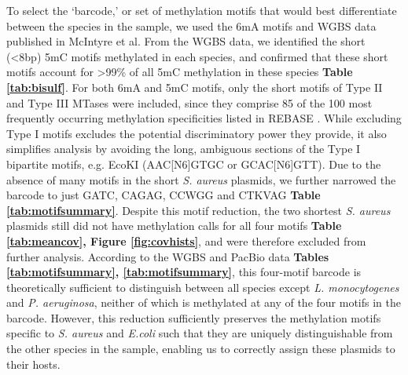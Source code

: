 To select the ‘barcode,’ or set of methylation motifs that would best differentiate between the species in the sample, we used the 6mA motifs and WGBS data published in McIntyre \citep{McIntyre2017-ed} et al. From the WGBS data, we identified the short (<8bp) 5mC motifs methylated in each species, and confirmed that these short motifs account for >99\% of all 5mC methylation in these species {\bf Table \ref{tab:bisulf}}. For both 6mA and 5mC motifs, only the short motifs of Type II and Type III MTases were included, since they comprise 85 of the 100 most frequently occurring methylation specificities listed in REBASE \citep{Roberts2003-ss}. While excluding Type I motifs excludes the potential discriminatory power they provide, it also simplifies analysis by avoiding the long, ambiguous sections of the Type I bipartite motifs, e.g. EcoKI (AAC[N6]GTGC or GCAC[N6]GTT). Due to the absence of many motifs in the short \textit{S. aureus} plasmids, we further narrowed the barcode to just GATC, CAGAG, CCWGG and CTKVAG {\bf Table \ref{tab:motifsummary}}. Despite this motif reduction, the two shortest \textit{S. aureus} plasmids still did not have methylation calls for all four motifs {\bf Table \ref{tab:meancov}, Figure \ref{fig:covhists}}, and were therefore excluded from further analysis. According to the WGBS and PacBio data \citep{McIntyre2017-ed} {\bf Tables \ref{tab:motifsummary}, \ref{tab:motifsummary}}, this four-motif barcode is theoretically sufficient to distinguish between all species except \textit{L. monocytogenes} and \textit{P. aeruginosa}, neither of which is methylated at any of the four motifs in the barcode. However, this reduction sufficiently preserves the methylation motifs specific to \textit{S. aureus} and \textit{E.coli} such that they are uniquely distinguishable from the other species in the sample, enabling us to correctly assign these plasmids to their hosts.


